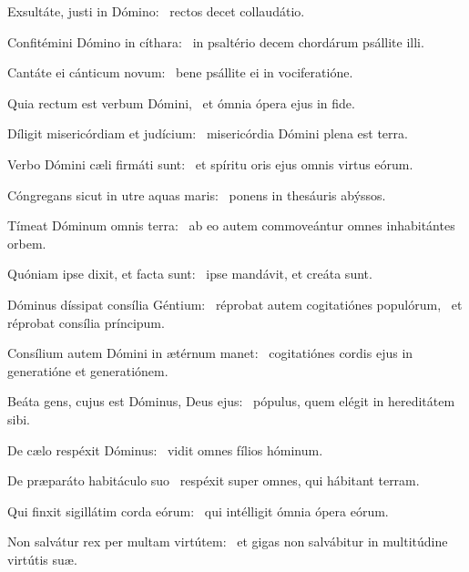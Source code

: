 \item Exsultáte, justi in Dómino:~\psstar{} rectos decet collaudátio.

\item Confitémini Dómino in cíthara:~\psstar{} in psaltério decem chordárum psállite illi.

\item Cantáte ei cánticum novum:~\psstar{} bene psállite ei in vociferatióne.

\item Quia rectum est verbum Dómini,~\psstar{} et ómnia ópera ejus in fide.

\item Díligit misericórdiam et judícium:~\psstar{} misericórdia Dómini plena est terra.

\item Verbo Dómini cæli firmáti sunt:~\psstar{} et spíritu oris ejus omnis virtus eórum.

\item Cóngregans sicut in utre aquas maris:~\psstar{} ponens in thesáuris abýssos.

\item Tímeat Dóminum omnis terra:~\psstar{} ab eo autem commoveántur omnes inhabitántes orbem.

\item Quóniam ipse dixit, et facta sunt:~\psstar{} ipse mandávit, et creáta sunt.

\item Dóminus díssipat consília Géntium:~\pscross{} réprobat autem cogitatiónes populórum,~\psstar{} et réprobat consília príncipum.

\item Consílium autem Dómini in ætérnum manet:~\psstar{} cogitatiónes cordis ejus in generatióne et generatiónem.

\item Beáta gens, cujus est Dóminus, Deus ejus:~\psstar{} pópulus, quem elégit in hereditátem sibi.

\item De cælo respéxit Dóminus:~\psstar{} vidit omnes fílios hóminum.

\item De præparáto habitáculo suo~\psstar{} respéxit super omnes, qui hábitant terram.

\item Qui finxit sigillátim corda eórum:~\psstar{} qui intélligit ómnia ópera eórum.

\item Non salvátur rex per multam virtútem:~\psstar{} et gigas non salvábitur in multitúdine virtútis suæ.

